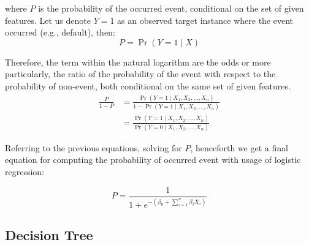 where $P$ is the probability of the occurred event, conditional on the set of given features. Let us denote $Y=1$ as an observed target instance where the event occurred (e.g., default), then:
\begin{equation}\label{eq}
    P = \operatorname{Pr}(Y=1 \mid X)
\end{equation}

Therefore, the term within the natural logarithm are the odds or more particularly, the ratio of the probability of the event with respect to the probability of non-event, both conditional on the same set of given features.
\begin{equation}\label{eq}
    \begin{aligned}
    \frac{P}{1-P}  {} & = \frac{\operatorname{Pr}(Y=1 \mid X_1,X_2,\ldots,X_n)}{1-\operatorname{Pr}(Y=1 \mid X_1,X_2,\ldots,X_n)} \\
    & = \frac{\operatorname{Pr}(Y=1 \mid X_1,X_2,\ldots,X_n)}{\operatorname{Pr}(Y=0 \mid X_1,X_2,\ldots,X_n)}
\end{aligned}
    \end{equation}

Referring to the previous equations, solving for $P$, henceforth we get a final equation for computing the probability of occurred event with usage of logistic regression:

\begin{equation}\label{eq}
P = \frac{1}{1+e^{-\left(\beta_0 + \displaystyle\sum_{i=1}^{n} \beta_i X_i\right)}}
\end{equation}

\subsection{Decision Tree}
\label{subsec:dt}

